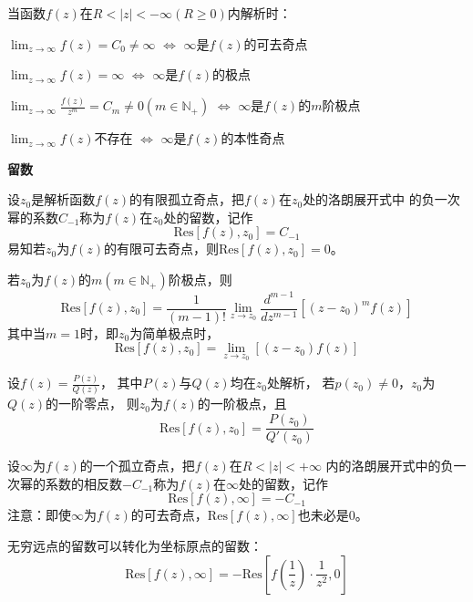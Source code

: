 \documentclass[a4paper,12pt]{article}
\begin{document}
当函数$f\left(z\right)$在$R<\left|z\right|<-\infty\left(R\ge0\right)$内解析时：
\begin{center}
    $\lim_{z\to\infty}f\left(z\right)=C_0\ne\infty$
    $\Longleftrightarrow$
    $\infty$是$f\left(z\right)$的可去奇点

    $\lim_{z\to\infty}f\left(z\right)=\infty$
    $\Longleftrightarrow$
    $\infty$是$f\left(z\right)$的极点

    $\lim_{z\to\infty}\frac{f\left(z\right)}{z^m}=C_{m}\ne0\left(m\in\mathbb{N}_+\right)$
    $\Longleftrightarrow$
    $\infty$是$f\left(z\right)$的$m$阶极点

    $\lim_{z\to\infty}f\left(z\right)$不存在
    $\Longleftrightarrow$
    $\infty$是$f\left(z\right)$的本性奇点
\end{center}

\noindent
\textbf{留数}

设$z_0$是解析函数$f\left(z\right)$的有限孤立奇点，把$f\left(z\right)$在$z_0$处的洛朗展开式中
的负一次幂的系数$C_{-1}$称为$f\left(z\right)$在$z_0$处的留数，记作
$$
\text{Res}\left[f\left(z\right),z_0\right]=C_{-1}
$$
易知若$z_0$为$f\left(z\right)$的有限可去奇点，则$\text{Res}\left[f\left(z\right),z_0\right]=0$。

若$z_0$为$f\left(z\right)$的$m\left(m\in\mathbb{N}_+\right)$阶极点，则
$$
\text{Res}\left[f\left(z\right),z_0\right]=\frac1{\left(m-1\right)!}
\lim_{z\to z_0}\frac{d^{m-1}}{dz^{m-1}}\left[\left(z-z_0\right)^mf\left(z\right)\right]
$$
其中当$m=1$时，即$z_0$为简单极点时，
$$
\text{Res}\left[f\left(z\right),z_0\right]=
\lim_{z\to z_0}\left[\left(z-z_0\right)f\left(z\right)\right]
$$

设$f\left(z\right)=\frac{P\left(z\right)}{Q\left(z\right)}$，
其中$P\left(z\right)$与$Q\left(z\right)$均在$z_0$处解析，
若$p\left(z_0\right)\ne0$，$z_0$为$Q\left(z\right)$的一阶零点，
则$z_0$为$f\left(z\right)$的一阶极点，且
$$
\text{Res}\left[f\left(z\right),z_0\right]=\frac{P\left(z_0\right)}{Q'\left(z_0\right)}
$$

设$\infty$为$f\left(z\right)$的一个孤立奇点，把$f\left(z\right)$在$R<\left|z\right|<+\infty$
内的洛朗展开式中的负一次幂的系数的相反数$-C_{-1}$称为$f\left(z\right)$在$\infty$处的留数，记作
$$
\text{Res}\left[f\left(z\right),\infty\right]=-C_{-1}
$$
注意：即使$\infty$为$f\left(z\right)$的可去奇点，$\text{Res}\left[f\left(z\right),\infty\right]$也未必是$0$。

无穷远点的留数可以转化为坐标原点的留数：
$$
\text{Res}\left[f\left(z\right),\infty\right]=
-\text{Res}\left[f\left(\frac1z\right)\cdot\frac1{z^2},0\right]
$$
\end{document}
